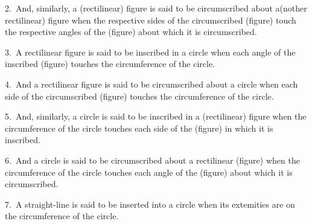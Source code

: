 \begin{Parallel}{}{}
{2.~And, similarly, a  (rectilinear) figure is said to be circumscribed about a(nother rectilinear) figure when the respective sides of the circumscribed
(figure) touch the respective angles of the (figure) about which it is
circumscribed.

3.~A rectilinear figure is said to be inscribed in a circle when
each angle of the inscribed (figure) touches the circumference of the
circle.

4.~And a rectilinear figure is said to be circumscribed about a circle
when each side of the circumscribed (figure) touches the
circumference of the circle.

5.~And, similarly, a circle is said to be inscribed in a (rectilinear) figure
when the circumference of the circle touches each  side of
the (figure) in which it is inscribed.

6.~And a circle is said to be circumscribed about a rectilinear (figure)
when the circumference of the circle touches each  angle of the
(figure) about which it is circumscribed.

7.~A straight-line is said to be inserted into a circle when its extemities
are on the circumference of the circle.}
\end{Parallel}


